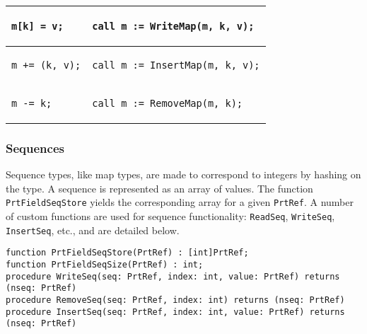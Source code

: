 \documentclass{llncs}
\providecommand{\tabularnewline}{\\}
\begin{document}
\begin{center}
\begin{tabular}{|p{}|p{}|}
\begin{verbatim}
m[k] = v;
\end{verbatim}
&
\begin{verbatim}
call m := WriteMap(m, k, v);
\end{verbatim}

\tabularnewline
\hline
\begin{verbatim}
m += (k, v);
\end{verbatim}
&
\begin{verbatim}
call m := InsertMap(m, k, v);
\end{verbatim}
\tabularnewline
\hline

\begin{verbatim}
m -= k;
\end{verbatim}
&
\begin{verbatim}
call m := RemoveMap(m, k);
\end{verbatim}
\tabularnewline
\hline


\end{tabular}
\end{center}

\pagebreak
\subsubsection{Sequences}
Sequence types, like map types, are made to correspond to integers by hashing on the type. A sequence is represented as an array of values. The function \texttt{PrtFieldSeqStore} yields the corresponding array for a given \texttt{PrtRef}. A number of custom functions are used for sequence functionality: \texttt{ReadSeq}, \texttt{WriteSeq}, \texttt{InsertSeq}, etc., and are detailed below.

\begin{verbatim}
function PrtFieldSeqStore(PrtRef) : [int]PrtRef;
function PrtFieldSeqSize(PrtRef) : int;
procedure WriteSeq(seq: PrtRef, index: int, value: PrtRef) returns (nseq: PrtRef)
procedure RemoveSeq(seq: PrtRef, index: int) returns (nseq: PrtRef)
procedure InsertSeq(seq: PrtRef, index: int, value: PrtRef) returns (nseq: PrtRef)
\end{verbatim}
\end{document}
